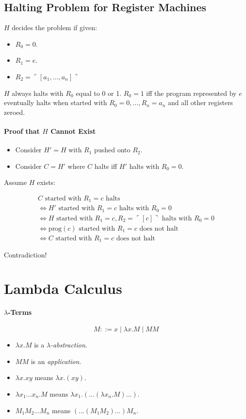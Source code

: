 \documentclass[twocolumn,english]{article}
\begin{document}
\subsection{Halting Problem for Register Machines}

$H$ decides the problem if given:
\begin{itemize}
\item $R_{0}=0$.
\item $R_{1}=e$.
\item $R_{2}=\ulcorner\left[a_{1},\dots,a_{n}\right]\urcorner$
\end{itemize}
$H$ always halts with $R_{0}$ equal to 0 or 1. $R_{0}=1$ iff the
program represented by $e$ eventually halts when started with $R_{0}=0,\dots,R_{n}=a_{n}$
and all other registers zeroed.

\paragraph{Proof that $H$ Cannot Exist}
\begin{itemize}
\item Consider $H'=H$ with $R_{1}$ pushed onto $R_{2}$.
\item Consider $C=H'$ where $C$ halts iff $H'$ halts with $R_{0}=0$.
\end{itemize}
Assume $H$ exists:

\begin{multline*}
C\text{ started with }R_{1}=c\text{ halts}\\
\iff H'\text{ started with }R_{1}=c\text{ halts with }R_{0}=0\\
\iff H\text{ started with }R_{1}=c,R_{2}=\ulcorner\left[c\right]\urcorner\text{ halts with }R_{0}=0\\
\iff\text{prog}\left(c\right)\text{ started with }R_{1}=c\text{ does not halt}\\
\iff C\text{ started with }R_{1}=c\text{ does not halt}
\end{multline*}

Contradiction!

\section{Lambda Calculus}

\paragraph{$\lambda$-Terms}

\[
M::=x\mid\lambda x.M\mid MM
\]
\begin{itemize}
\item $\lambda x.M$ is a \emph{$\lambda$-abstraction}.
\item $MM$ is an \emph{application}.
\item $\lambda x.xy$ means $\lambda x.\left(xy\right)$.
\item $\lambda x_{1}\dots x_{n}.M$ means $\lambda x_{1}.\left(\dots\left(\lambda x_{n}.M\right)\dots\right)$.
\item $M_{1}M_{2}\dots M_{n}$ means $\left(\dots\left(M_{1}M_{2}\right)\dots\right)M_{n}$.
\end{itemize}
\end{document}
